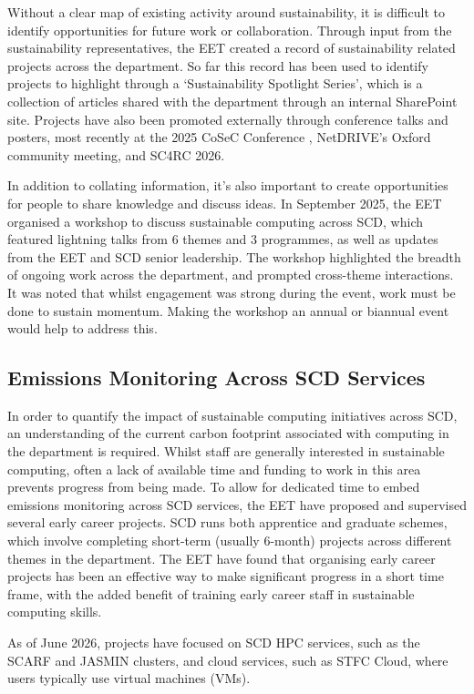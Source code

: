 \documentclass[sigconf]{acmart}
\begin{document}
Without a clear map of existing activity around sustainability, it is difficult to identify opportunities for future work or collaboration. Through input from the sustainability representatives, the EET created a record of sustainability related projects across the department. So far this record has been used to identify projects to highlight through a ‘Sustainability Spotlight Series’, which is a collection of articles shared with the department through an internal SharePoint site. Projects have also been promoted externally through conference talks and posters, most recently at the 2025 CoSeC Conference \cite{CoSecEET}, NetDRIVE’s Oxford community meeting\cite{NetDriveCommunityMeeting}, and SC4RC 2026\cite{SC4RC2026}. 

In addition to collating information, it’s also important to create opportunities for people to share knowledge and discuss ideas. In September 2025, the EET organised a workshop to discuss sustainable computing across SCD, which featured lightning talks from 6 themes and 3 programmes, as well as updates from the EET and SCD senior leadership. The workshop highlighted the breadth of ongoing work across the department, and prompted cross-theme interactions. It was noted that whilst engagement was strong during the event, work must be done to sustain momentum. Making the workshop an annual or biannual event would help to address this. 

\subsection{Emissions Monitoring Across SCD Services}
In order to quantify the impact of sustainable computing initiatives across SCD, an understanding of the current carbon footprint associated with computing in the department is required. Whilst staff are generally interested in sustainable computing, often a lack of available time and funding to work in this area prevents progress from being made. To allow for dedicated time to embed emissions monitoring across SCD services, the EET have proposed and supervised several early career projects. SCD runs both apprentice and graduate schemes, which involve completing short-term (usually 6-month) projects across different themes in the department. The EET have found that organising early career projects has been an effective way to make significant progress in a short time frame, with the added benefit of training early career staff in sustainable computing skills.

As of June 2026, projects have focused on SCD HPC services, such as the SCARF and JASMIN clusters, and cloud services, such as STFC Cloud, where users typically use virtual machines (VMs).
\end{document}
